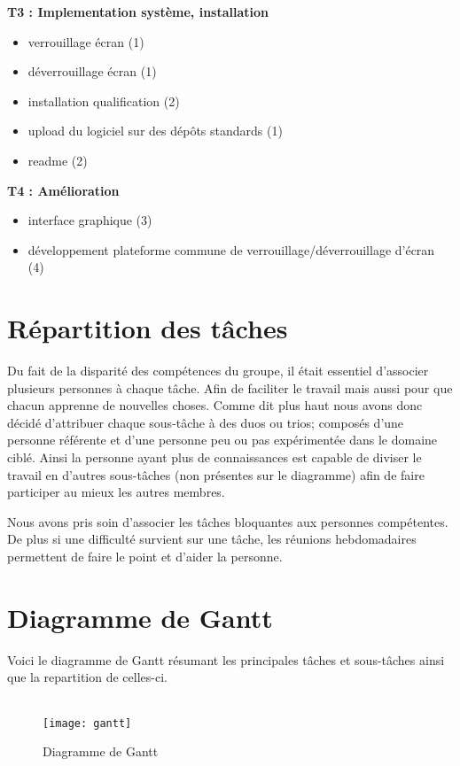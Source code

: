 \textbf{T3 : Implementation système, installation}
\begin{itemize}
  \item{verrouillage écran (1)}
  \item{déverrouillage écran (1)}
  \item{installation qualification (2)}
  \item{upload du logiciel sur des dépôts standards (1)}
  \item{readme (2)}
\end{itemize}

\textbf{T4 : Amélioration}
\begin{itemize}
  \item{interface graphique (3)}
  \item{développement plateforme commune de verrouillage/déverrouillage
        d’écran (4)}
\end{itemize}

\newpage

\section{Répartition des tâches}

Du fait de la disparité des compétences du groupe, il était essentiel
d'associer plusieurs personnes à chaque tâche. Afin de faciliter le travail
mais aussi pour que chacun apprenne de nouvelles choses. Comme dit plus haut
nous avons donc
décidé d'attribuer chaque sous-tâche à des duos ou trios; composés d'une
personne référente et d'une personne peu ou pas expérimentée dans le domaine
ciblé. Ainsi la personne ayant plus de connaissances est capable de diviser
le travail en d'autres sous-tâches (non présentes sur le diagramme) afin de faire
participer au mieux les autres membres.

Nous avons pris soin d'associer les tâches bloquantes aux personnes
compétentes. De plus si une difficulté survient sur une tâche,
les réunions hebdomadaires permettent de faire le point et d'aider la
personne.

\section{Diagramme de Gantt}
Voici le diagramme de Gantt résumant les principales tâches et sous-tâches
ainsi que la repartition de celles-ci.
\\
\\
\begin{figure}[h]
  \texttt{[image: gantt]}
  \caption{Diagramme de Gantt}
\end{figure}
